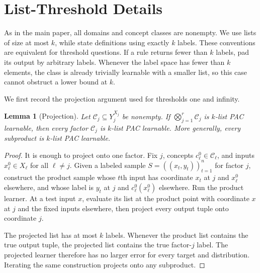 \documentclass[twoside]{article}
\newtheorem{lemma}[theorem]{Lemma}
\newcommand{\cC}{\mathcal C}
\begin{document}
\runningauthor{}


\appendix

\section{List-Threshold Details}
\label{app:list}

As in the main paper, all domains and concept classes are nonempty. We use lists of size at most $k$, while \citet{hanneke2024list} state definitions using exactly $k$ labels. These conventions are equivalent for threshold questions. If a rule returns fewer than $k$ labels, pad its output by arbitrary labels. Whenever the label space has fewer than $k$ elements, the class is already trivially learnable with a smaller list, so this case cannot obstruct a lower bound at $k$.

We first record the projection argument used for thresholds one and infinity.

\begin{lemma}[Projection]\label{lem:projection}
Let $\cC_j\subseteq Y_j^{X_j}$ be nonempty. If $\bigotimes_{j=1}^r\cC_j$ is $k$-list PAC learnable, then every factor $\cC_j$ is $k$-list PAC learnable. More generally, every subproduct is $k$-list PAC learnable.
\end{lemma}

\begin{proof}
It is enough to project onto one factor. Fix $j$, concepts $c_\ell^0\in\cC_\ell$, and inputs $x_\ell^0\in X_\ell$ for all $\ell\neq j$. Given a labeled sample $S=((x_t,y_t))_{t=1}^n$ for factor $j$, construct the product sample whose $t$th input has coordinate $x_t$ at $j$ and $x_\ell^0$ elsewhere, and whose label is $y_t$ at $j$ and $c_\ell^0(x_\ell^0)$ elsewhere. Run the product learner. At a test input $x$, evaluate its list at the product point with coordinate $x$ at $j$ and the fixed inputs elsewhere, then project every output tuple onto coordinate $j$.

The projected list has at most $k$ labels. Whenever the product list contains the true output tuple, the projected list contains the true factor-$j$ label. The projected learner therefore has no larger error for every target and distribution. Iterating the same construction projects onto any subproduct.
\end{proof}
\end{document}
